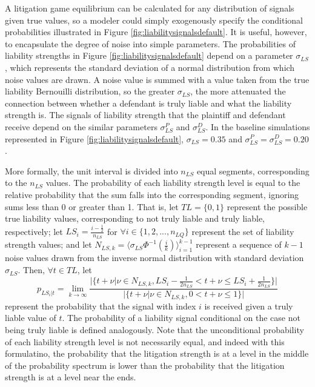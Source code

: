 \documentclass{article}
\begin{document}
A litigation game equilibrium can be calculated for any distribution of signals given true values, so a modeler could simply exogenously specify the conditional probabilities illustrated in Figure \ref{fig:liabilitysignalsdefault}. It is useful, however, to encapsulate the degree of noise into simple parameters. The probabilities of liability strengths in Figure \ref{fig:liabilitysignalsdefault} depend on a parameter $\sigma_{LS}$, which represents the standard deviation of a normal distribution from which noise values are drawn. A noise value is summed with a value taken from the true liability Bernouilli distribution, so the greater $\sigma_{LS}$, the more attenuated the connection between whether a defendant is truly liable and what the liability strength is. The signals of liability strength that the plaintiff and defendant receive depend on the similar parameters $\sigma_{LS}^P$ and $\sigma_{LS}^D$. In the baseline simulations represented in Figure \ref{fig:liabilitysignalsdefault}, $\sigma_{LS}=0.35$ and $\sigma_{LS}^P=\sigma_{LS}^D=0.20$.

More formally, the unit interval is divided into $n_{LS}$ equal segments, corresponding to the $n_{LS}$ values. The probability of each liability strength level is equal to the relative probability that the sum falls into the corresponding segment, ignoring sums less than 0 or greater than 1. That is, let $TL=\{0,1\}$ represent the possible true liability values, corresponding to not truly liable and truly liable, respectively; let $LS_i=\frac{i - \frac{1}{2} }{n_{LS} }$ for $\forall i \in \{1,2,...,n_{LQ}\}$ represent the set of liability strength values; and let $N_{LS,k}=\langle\sigma_{LS}\Phi^{-1}(\frac{i}{k}) \rangle_{i=1}^{k-1}$ represent a sequence of $k-1$ noise values drawn from the inverse normal  distribution with standard deviation $\sigma_{LS}$. Then, $\forall t\in TL$, let 
\begin{equation} 
p_{LS_i|t} = \lim_{k\to\infty} \frac{\lvert\{t+\nu |\nu \in N_{LS,k}, LS_i - \frac{1}{2n_{LS} }<t+\nu \leq LS_i + \frac{1}{2n_{LS} }\}\rvert}{\lvert\{t+\nu |\nu \in N_{LS,k}, 0<t+\nu \leq 1 \}\rvert}
\end{equation}
represent the probability that the signal with index $i$ is received given a truly liable value of $t$. The probability of a liability signal conditional on the case not being truly liable is defined analogously. Note that the unconditional probability of each liability strength level is not necessarily equal, and indeed with this formulatino, the probability that the litigation strength is at a level in the middle of the probability spectrum is lower than the probability that the litigation strength is at a level near the ends.
\end{document}
